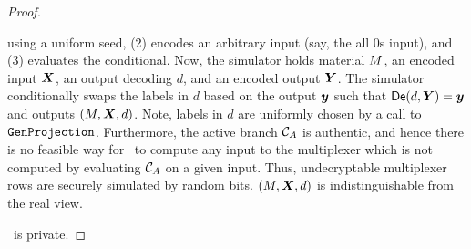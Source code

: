 \begin{proof}
\begin{itemize}
      using a uniform seed, (2) encodes an arbitrary input (say, the
      all 0s input), and (3) evaluates the conditional.
      Now, the simulator holds material $M$, an encoded input
      $\gcirinp$, an output decoding $d$, and an encoded output
      $\gcirout$.
      The simulator conditionally swaps the labels in $d$ based on the
      output $\cirout$ such that $\gDe(d, \gcirout) = \cirout$ and
      outputs $(\mat, \gcirinp, d)$.
      Note, labels in $d$ are uniformly chosen by a call to
      $\mathtt{GenProjection}$.
      Furthermore, the active branch $\mathcal C_{A}$ is authentic, and
      hence there is no feasible way for \adv\ to compute any input to
      the multiplexer which is
      not computed by evaluating $\mathcal C_{A}$ on a given input.
      Thus, undecryptable multiplexer rows are securely simulated by
      random bits.
      $(\mat, \gcirinp, d)$ is indistinguishable from the real view.
  \end{itemize}
  \ourschemelong\ is private.
\end{proof}

